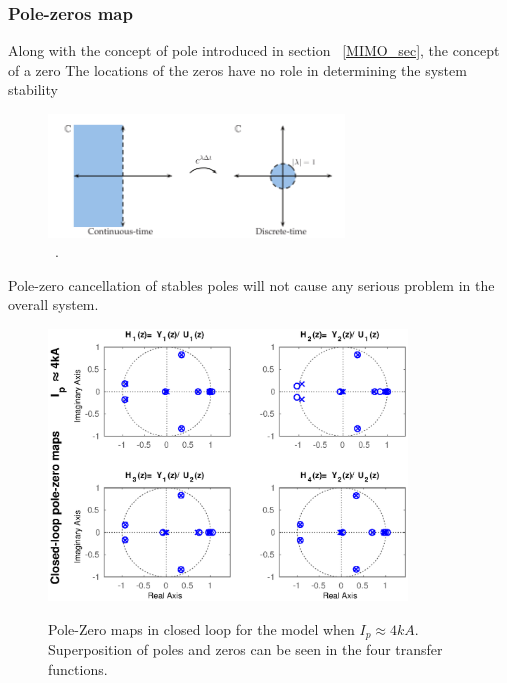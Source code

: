 \subsubsection{Pole-zeros map}

Along with the  concept of pole introduced in section ~\ref{MIMO_sec}, the concept of a zero 
The locations of the zeros have no role in determining the system stability

\begin{figure}
	\centering
	\includegraphics[width=0.7\textwidth]{Chp5/PolesZerosMaps.png}
	
	\caption{~\cite[Chapter~8]{DataDriven2019}\label{PoleZeroMap}.}
\end{figure}

Pole-zero cancellation of stables poles will not cause any serious problem in the overall system.

\begin{figure}
	\centering
	\includegraphics[width=0.85\textwidth]{Chp5/PoleZero/PoleZeroClosePos.eps}
	\label{PoleZeroClosePos}
	\caption{Pole-Zero maps in closed loop for the model when $I_p\approx 4 kA$. Superposition  of poles and zeros can be seen in the four transfer functions.}
\end{figure}	

